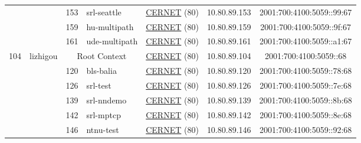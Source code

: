 \begin{small}
\begin{center}
\begin{longtable}{|c|c|c|c|c|c|c|c|}
  &  & \tiny{153} & \multicolumn{1}{|l|}{\tiny{srl-seattle}} & \multicolumn{2}{|c|}{\tiny{\href{http://www.cernet.edu.cn}{CERNET} (80)}} & \tiny{10.80.89.153} & \tiny{2001:700:4100:5059::99:67} \\* \cline{3-3}\cline{4-4}\cline{5-5}\cline{6-6}\cline{7-7}\cline{8-8}
  &  & \tiny{159} & \multicolumn{1}{|l|}{\tiny{hu-multipath}} & \multicolumn{2}{|c|}{\tiny{\href{http://www.cernet.edu.cn}{CERNET} (80)}} & \tiny{10.80.89.159} & \tiny{2001:700:4100:5059::9f:67} \\* \cline{3-3}\cline{4-4}\cline{5-5}\cline{6-6}\cline{7-7}\cline{8-8}
  &  & \tiny{161} & \multicolumn{1}{|l|}{\tiny{ude-multipath}} & \multicolumn{2}{|c|}{\tiny{\href{http://www.cernet.edu.cn}{CERNET} (80)}} & \tiny{10.80.89.161} & \tiny{2001:700:4100:5059::a1:67} \\ \hline
 \multirow{8}{*}{\tiny{104}} & \multicolumn{1}{|l|}{\multirow{8}{*}{\tiny{lizhigou}}} & \multicolumn{2}{|c|}{\tiny{Root Context}} & \multicolumn{2}{|c|}{\tiny{\href{http://www.cernet.edu.cn}{CERNET} (80)}} & \tiny{10.80.89.104} & \tiny{2001:700:4100:5059::68} \\* \cline{3-3}\cline{4-4}\cline{5-5}\cline{6-6}\cline{7-7}\cline{8-8}
  &  & \tiny{120} & \multicolumn{1}{|l|}{\tiny{bls-balia}} & \multicolumn{2}{|c|}{\tiny{\href{http://www.cernet.edu.cn}{CERNET} (80)}} & \tiny{10.80.89.120} & \tiny{2001:700:4100:5059::78:68} \\* \cline{3-3}\cline{4-4}\cline{5-5}\cline{6-6}\cline{7-7}\cline{8-8}
  &  & \tiny{126} & \multicolumn{1}{|l|}{\tiny{srl-test}} & \multicolumn{2}{|c|}{\tiny{\href{http://www.cernet.edu.cn}{CERNET} (80)}} & \tiny{10.80.89.126} & \tiny{2001:700:4100:5059::7e:68} \\* \cline{3-3}\cline{4-4}\cline{5-5}\cline{6-6}\cline{7-7}\cline{8-8}
  &  & \tiny{139} & \multicolumn{1}{|l|}{\tiny{srl-nndemo}} & \multicolumn{2}{|c|}{\tiny{\href{http://www.cernet.edu.cn}{CERNET} (80)}} & \tiny{10.80.89.139} & \tiny{2001:700:4100:5059::8b:68} \\* \cline{3-3}\cline{4-4}\cline{5-5}\cline{6-6}\cline{7-7}\cline{8-8}
  &  & \tiny{142} & \multicolumn{1}{|l|}{\tiny{srl-mptcp}} & \multicolumn{2}{|c|}{\tiny{\href{http://www.cernet.edu.cn}{CERNET} (80)}} & \tiny{10.80.89.142} & \tiny{2001:700:4100:5059::8e:68} \\* \cline{3-3}\cline{4-4}\cline{5-5}\cline{6-6}\cline{7-7}\cline{8-8}
  &  & \tiny{146} & \multicolumn{1}{|l|}{\tiny{ntnu-test}} & \multicolumn{2}{|c|}{\tiny{\href{http://www.cernet.edu.cn}{CERNET} (80)}} & \tiny{10.80.89.146} & \tiny{2001:700:4100:5059::92:68} \\* \cline{3-3}\cline{4-4}\cline{5-5}\cline{6-6}\cline{7-7}\cline{8-8}

\end{longtable}
\end{center}
\end{small}
